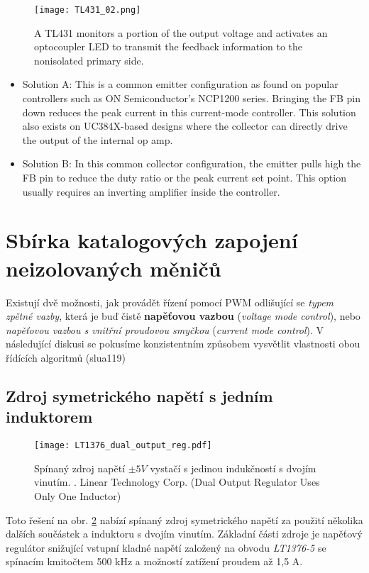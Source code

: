       \begin{figure}[ht!]
        \centering
        \texttt{[image: TL431\_02.png]}
        \caption{A TL431 monitors a portion of the output voltage and activates an optocoupler LED 
                 to transmit the feedback information to the nonisolated primary side. 
                 \cite[s.~43]{Basso2008}}
        \label{enz:fig_tl431_02}
      \end{figure}
       
      \begin{itemize}[noitemsep]
        \item Solution A: This is a common emitter configuration as found on popular controllers 
              such as ON Semiconductor’s NCP1200 series. Bringing the FB pin down reduces the peak 
              current in this current-mode controller. This solution also exists on UC384X-based 
              designs where the collector can directly drive the output of the internal op amp.
        \item Solution B: In this common collector configuration, the emitter pulls high the FB pin 
              to reduce the duty ratio or the peak current set point. This option usually requires 
              an inverting amplifier inside the controller.
      \end{itemize}
    

  \section{Sbírka katalogových zapojení neizolo\-va\-ných měničů}\label{aes:sec009}
    Existují dvě možnosti, jak provádět řízení pomocí PWM odlišující se \emph{typem zpětné
    vazby}, která je buď čistě \textbf{napěťovou vazbou} (\emph{voltage mode control}), nebo
    \emph{napěťovou vazbou s vnitřní proudovou smyčkou} (\emph{current mode control}). V
    následující diskusi se pokusíme konzistentním způsobem vysvětlit vlastnosti obou řídících
    algoritmů (slua119)
    
    \subsection{Zdroj symetrického napětí s jedním induktorem}
      \begin{figure}[ht!]
        \centering
        \texttt{[image: LT1376\_dual\_output\_reg.pdf]}
        \caption[Spínaný zdroj napětí $\pm5 V$ vystačí s jedinou indukčností s dvojím
                 vinutím]{Spínaný zdroj napětí $\pm5 V$ vystačí s jedinou indukčností s dvojím
                 vinutím. \cite{DN100}. Linear Technology Corp. (Dual Output Regulator Uses Only
                 One Inductor)}
        \label{enz:fig_LT1376_cir1}
      \end{figure}
      Toto řešení na obr. \ref{enz:fig_LT1376_cir1} nabízí spínaný zdroj symetrického napětí za
      použití několika dalších součástek a induktoru s dvojím vinutím. Základní části zdroje je
      napěťový regulátor snižující vstupní kladné napětí založený na obvodu \emph{LT1376-5} se
      spínacím kmitočtem 500 kHz a možností zatížení proudem až 1,5 A.

